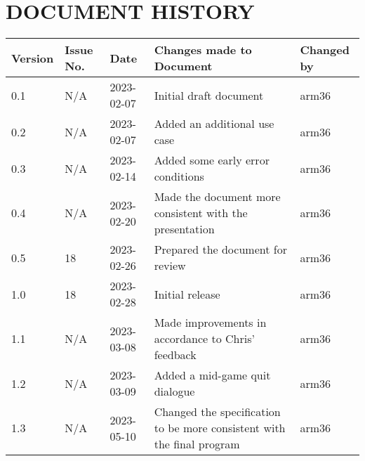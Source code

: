 \documentclass{project}
\begin{document}
\section*{DOCUMENT HISTORY}
\begin{tabular}{|l | l | l | l | l |}
\hline
Version & Issue No. & Date & Changes made to Document & Changed by \\
\hline
0.1 & N/A & 2023-02-07 & Initial draft document & arm36 \\
\hline
0.2 & N/A & 2023-02-07 & Added an additional use case & arm36 \\
\hline
0.3 & N/A & 2023-02-14 & Added some early error conditions & arm36 \\
\hline
0.4 & N/A & 2023-02-20 & Made the document more consistent with the presentation & arm36 \\
\hline
0.5 & 18 & 2023-02-26 & Prepared the document for review & arm36 \\
\hline
1.0 & 18 & 2023-02-28 & Initial release & arm36 \\
\hline
1.1 & N/A & 2023-03-08 & Made improvements in accordance to Chris' feedback & arm36 \\
\hline
1.2 & N/A & 2023-03-09 & Added a mid-game quit dialogue & arm36 \\
\hline
1.3 & N/A & 2023-05-10 & Changed the specification to be more consistent with the final program & arm36 \\
\hline
\end{tabular}
\label{thelastpage}
\end{document}
